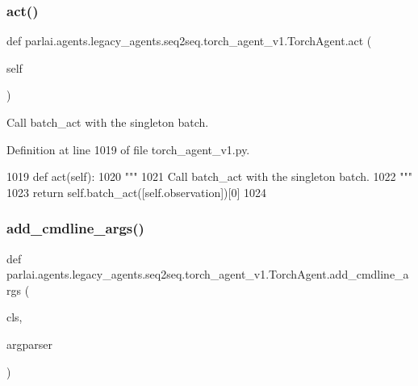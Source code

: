 \subsubsection{\texorpdfstring{act()}{act()}}
{\footnotesize\ttfamily def parlai.\+agents.\+legacy\+\_\+agents.\+seq2seq.\+torch\+\_\+agent\+\_\+v1.\+Torch\+Agent.\+act (\begin{DoxyParamCaption}\item[{}]{self }\end{DoxyParamCaption})}

\begin{DoxyVerb}Call batch_act with the singleton batch.
\end{DoxyVerb}
 

Definition at line 1019 of file torch\+\_\+agent\+\_\+v1.\+py.


\begin{DoxyCode}
1019     \textcolor{keyword}{def }act(self):
1020         \textcolor{stringliteral}{"""}
1021 \textcolor{stringliteral}{        Call batch\_act with the singleton batch.}
1022 \textcolor{stringliteral}{        """}
1023         \textcolor{keywordflow}{return} self.batch\_act([self.observation])[0]
1024 
\end{DoxyCode}
\mbox{\label{classparlai_1_1agents_1_1legacy__agents_1_1seq2seq_1_1torch__agent__v1_1_1TorchAgent_a00701a40d62943dbd887525bf8e8002d}} 
\subsubsection{\texorpdfstring{add\+\_\+cmdline\+\_\+args()}{add\_cmdline\_args()}}
{\footnotesize\ttfamily def parlai.\+agents.\+legacy\+\_\+agents.\+seq2seq.\+torch\+\_\+agent\+\_\+v1.\+Torch\+Agent.\+add\+\_\+cmdline\+\_\+args (\begin{DoxyParamCaption}\item[{}]{cls,  }\item[{}]{argparser }\end{DoxyParamCaption})}

